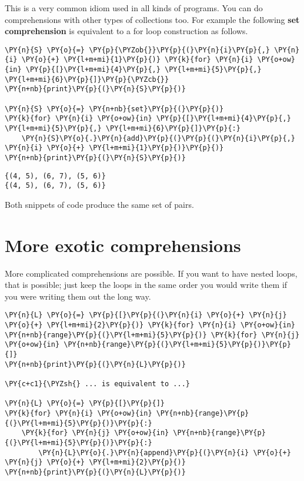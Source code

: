 This is a very common idiom used in all kinds of programs.  You can do comprehensions with other types of collections too.  For example the following \textbf{set comprehension} is equivalent to a for loop construction as follows.


\begin{Verbatim}[commandchars=\\\{\}]
\PY{n}{S} \PY{o}{=} \PY{p}{\PYZob{}}\PY{p}{(}\PY{n}{i}\PY{p}{,} \PY{n}{i} \PY{o}{+} \PY{l+m+mi}{1}\PY{p}{)} \PY{k}{for} \PY{n}{i} \PY{o+ow}{in} \PY{p}{[}\PY{l+m+mi}{4}\PY{p}{,} \PY{l+m+mi}{5}\PY{p}{,} \PY{l+m+mi}{6}\PY{p}{]}\PY{p}{\PYZcb{}}
\PY{n+nb}{print}\PY{p}{(}\PY{n}{S}\PY{p}{)}

\PY{n}{S} \PY{o}{=} \PY{n+nb}{set}\PY{p}{(}\PY{p}{)}
\PY{k}{for} \PY{n}{i} \PY{o+ow}{in} \PY{p}{[}\PY{l+m+mi}{4}\PY{p}{,} \PY{l+m+mi}{5}\PY{p}{,} \PY{l+m+mi}{6}\PY{p}{]}\PY{p}{:}
    \PY{n}{S}\PY{o}{.}\PY{n}{add}\PY{p}{(}\PY{p}{(}\PY{n}{i}\PY{p}{,} \PY{n}{i} \PY{o}{+} \PY{l+m+mi}{1}\PY{p}{)}\PY{p}{)}
\PY{n+nb}{print}\PY{p}{(}\PY{n}{S}\PY{p}{)}
\end{Verbatim}

\begin{Verbatim}
{(4, 5), (6, 7), (5, 6)}
{(4, 5), (6, 7), (5, 6)}

\end{Verbatim}


Both snippets of code produce the same set of pairs.

\section{More exotic comprehensions}


More complicated comprehensions are possible.  If you want to have nested loops, that is possible; just keep the loops in the same order you would write them if you were writing them out the long way.


\begin{Verbatim}[commandchars=\\\{\}]
\PY{n}{L} \PY{o}{=} \PY{p}{[}\PY{p}{(}\PY{n}{i} \PY{o}{+} \PY{n}{j} \PY{o}{+} \PY{l+m+mi}{2}\PY{p}{)} \PY{k}{for} \PY{n}{i} \PY{o+ow}{in} \PY{n+nb}{range}\PY{p}{(}\PY{l+m+mi}{5}\PY{p}{)} \PY{k}{for} \PY{n}{j} \PY{o+ow}{in} \PY{n+nb}{range}\PY{p}{(}\PY{l+m+mi}{5}\PY{p}{)}\PY{p}{]}
\PY{n+nb}{print}\PY{p}{(}\PY{n}{L}\PY{p}{)}

\PY{c+c1}{\PYZsh{} ... is equivalent to ...}

\PY{n}{L} \PY{o}{=} \PY{p}{[}\PY{p}{]}
\PY{k}{for} \PY{n}{i} \PY{o+ow}{in} \PY{n+nb}{range}\PY{p}{(}\PY{l+m+mi}{5}\PY{p}{)}\PY{p}{:}
    \PY{k}{for} \PY{n}{j} \PY{o+ow}{in} \PY{n+nb}{range}\PY{p}{(}\PY{l+m+mi}{5}\PY{p}{)}\PY{p}{:}
        \PY{n}{L}\PY{o}{.}\PY{n}{append}\PY{p}{(}\PY{n}{i} \PY{o}{+} \PY{n}{j} \PY{o}{+} \PY{l+m+mi}{2}\PY{p}{)}
\PY{n+nb}{print}\PY{p}{(}\PY{n}{L}\PY{p}{)}
\end{Verbatim}

